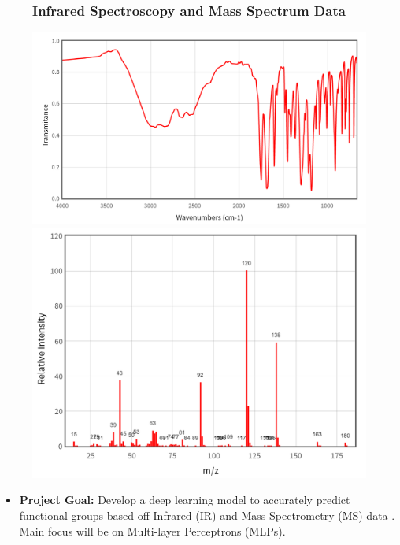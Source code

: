 \documentclass[10pt,hyperref={pdfpagelabels=false},xcolor=table]{beamer}
\begin{document}
\begin{frame}
    \begin{figure}
        \centering
        \frametitle{Infrared Spectroscopy and Mass Spectrum Data}
        \includegraphics[scale=0.35]{aspirin_IR}
        \includegraphics[scale=0.35]{MS _data_aspirin}
    \end{figure}
    \begin{itemize}
        \item \textbf{Project Goal:} Develop a deep learning model to accurately predict functional groups based off Infrared (IR) and Mass Spectrometry (MS) data . Main focus will be on Multi-layer Perceptrons (MLPs).
    \end{itemize}

\end{frame}
\end{document}
